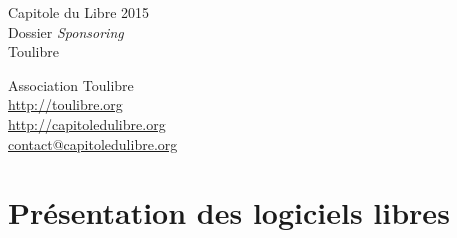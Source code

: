 \documentclass{cdl_sponsor}
\begin{document}
\thispagestyle{empty} %


\colorbox{Cdl}{
	\parbox[t]{1.0\linewidth}{
		\centering \fontsize{50pt}{80pt}\selectfont %
		\vspace*{0.7cm} %
		
		\hfill Capitole du Libre 2015		\\
		\hfill Dossier \textit{Sponsoring}  \\
		\hfill Toulibre  					\\\par
		
		\vspace*{0.7cm} %
	}
}


\vfill %

{\centering \large 
\hfill Association Toulibre \\
\hfill \url{http://toulibre.org} \\
\hfill \url{http://capitoledulibre.org} \\
\hfill \url{contact@capitoledulibre.org} \\
}
\clearpage


\section{Présentation des logiciels libres}

	
\end{document}
